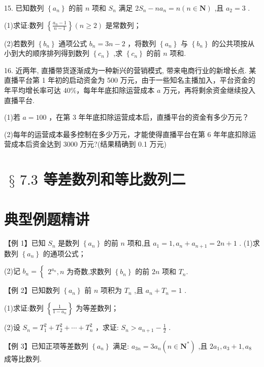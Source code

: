 15. 已知数列 $\left\{  {a}_{n}\right\}$ 的前 $n$ 项和 ${S}_{n}$ 满足 $2{S}_{n} - n{a}_{n} = n\left( {n \in  \mathbf{N}}\right)$ ,且 ${a}_{2} = 3$ .

(1)求证:数列 $\left\{  \frac{{a}_{n} - 1}{n - 1}\right\}  \left( {n \geq  2}\right)$ 是常数列；

(2)若数列 $\left\{  {b}_{n}\right\}$ 通项公式 ${b}_{n} = {3n} - 2$ ，将数列 $\left\{  {a}_{n}\right\}$ 与 $\left\{  {b}_{n}\right\}$ 的公共项按从小到大的顺序排列得到数列 $\left\{  {c}_{n}\right\}$ ,求 $\left\{  {c}_{n}\right\}$ 的前 $n$ 项和.

16. 近两年, 直播带货逐渐成为一种新兴的营销模式, 带来电商行业的新增长点. 某直播平台第 1 年初的启动资金为 500 万元，由于一些知名主播加入，平台资金的年平均增长率可达 40\%，每年年底扣除运营成本 $a$ 万元，再将剩余资金继续投入直播平台.

(1)若 $a = {100}$ ，在第 3 年年底扣除运营成本后，直播平台的资金有多少万元？

(2)每年的运营成本最多控制在多少万元，才能使得直播平台在第 6 年年底扣除运营成本后资金达到 3000 万元?(结果精确到 0.1 万元)

\section*{$\text{ § }{7.3}$ 等差数列和等比数列二}

\section*{典型例题精讲}

【例 1】已知 ${S}_{n}$ 是数列 $\left\{  {a}_{n}\right\}$ 的前 $n$ 项和,且 ${a}_{1} = 1,{a}_{n} + {a}_{n + 1} = {2n} + 1$ . (1)求数列 $\left\{  {a}_{n}\right\}$ 的通项公式；

(2)记 ${b}_{n} = \left\{  \begin{array}{l} {2}^{{a}_{n}},n\text{ 为奇数,求数列 }\left\{  {b}_{n}\right\}  \text{ 的前 }{2n}\text{ 项和 }{T}_{n}. \end{array}\right.$

【例 2】已知数列 $\left\{  {a}_{n}\right\}$ 前 $n$ 项积为 ${T}_{n}$ ,且 ${a}_{n} + {T}_{n} = 1$ .

(1)求证:数列 $\left\{  \frac{1}{1 - {a}_{n}}\right\}$ 为等差数列；

(2)设 ${S}_{n} = {T}_{1}^{2} + {T}_{2}^{2} + \cdots  + {T}_{n}^{2}$ ，求证: ${S}_{n} > {a}_{n + 1} - \frac{1}{2}$ .

【例 3】已知正项等差数列 $\left\{  {a}_{n}\right\}$ 满足: ${a}_{3n} = 3{a}_{n}\left( {n \in  {\mathbf{N}}^{ * }}\right)$ ,且 $2{a}_{1},{a}_{3} + 1,{a}_{8}$ 成等比数列.

